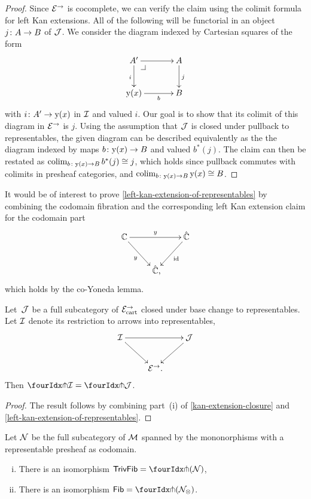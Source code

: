 \documentclass[reqno,10pt,a4paper,oneside,draft]{amsart}
\begin{document}
\begin{proof}
Since $\catE^\to$ is cocomplete, we can verify the claim using the colimit formula for left Kan extensions.
All of the following will be functorial in an object $j \co A \to B$ of $\cal{J}$.
We consider the diagram indexed by Cartesian squares of the form
\[
\xymatrix@C=1.2cm{
  A'
  \ar[r]
  \ar[d]_{i}
  \pullback{dr}
&
  A
  \ar[d]^{j}
\\
  \yon(x)
  \ar[r]_-b
&
  B
}
\]
with $i \co A' \to \yon(x)$ in $\cal{I}$ and valued $i$.
Our goal is to show that its colimit of this diagram in $\catE^\to$ is $j$.
Using the assumption that $\cal{J}$ is closed under pullback to representables, the given diagram can be described equivalently as the the diagram indexed by maps $b \co \yon(x) \to B$ and valued $b^*(j)$.
The claim can then be restated as $\colim_{b \co \yon(x) \to B} b^*(j) \iso j$, which holds since pullback commutes with colimits in presheaf categories, and $\colim_{b \co \yon(x) \to B} \yon(x) \iso B$.
\end{proof}

\begin{remark}
It would be of interest to prove \cref{left-kan-extension-of-representables} by combining the codomain fibration and the corresponding left Kan extension claim for the codomain part
\[
\xymatrix{
  \cat{C}
  \ar[rr]^{y}
  \ar[dr]_{y}
&&
  \hat{\catC}
  \ar[dl]^{\id}
\\&
  \hat{\cat{C}}
\rlap{,}}
\]
which holds by the co-Yoneda lemma.
\end{remark}

\begin{proposition} \label{awfs-on-arrows-into-representables}
Let~$\cal{J}$ be a full subcategory of $\catE_{\cart}^\to$ closed under base change to representables.
Let $\cal{I}$ denote its restriction to arrows into representables,
\[
\xymatrix{
  \cal{I}
  \ar[rr]
  \ar[dr]
&&
  \cal{J}
  \ar[dl]
\\&
  \catE^\to
\rlap{.}}
\]
Then $\liftr{\cal{I}} = \liftr{\cal{J}}$.
\end{proposition}

\begin{proof}
The result follows by combining part~(i) of \cref{kan-extension-closure} and \cref{left-kan-extension-of-representables}.
\end{proof}



\begin{theorem} \label{small-gen-triv-kan} Let $\cal{N}$ be the full subcategory of $\cal{M}$ spanned by the mononorphisms with a representable presheaf as codomain.
\begin{enumerate}[(i)]
\item There is an isomorphism $\TrivFib = \liftr{ ( \cal{N}) }$,
\item There is an isomorphism $\Fib = \liftr{(\cal{N}_\otimes)}$.
\end{enumerate}
\end{theorem}
\end{document}
